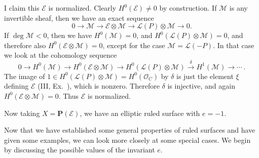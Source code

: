 {I claim this $\mathcal E$ is normalized. Clearly $H^0(\mathcal E)\ne0$ by construction. If $\mathcal M$ is any invertible sheaf, then we have an exact sequence
\[
0\to\mathcal M\to\mathcal E\otimes\mathcal M\to\mathcal L(P)\otimes\mathcal M\to0.
\]
If $\deg\mathcal M<0$, then we have $H^0(\mathcal M)=0$, and $H^0(\mathcal L(P)\otimes\mathcal M)=0$, and therefore also $H^0(\mathcal E\otimes\mathcal M)=0$, except for the case $\mathcal M=\mathcal L(-P)$. In that case we look at the cohomology sequence
\[
0\to H^0(\mathcal M)\to H^0(\mathcal E\otimes\mathcal M)\to H^0(\mathcal L(P)\otimes\mathcal M)\xrightarrow{\delta}H^1(\mathcal M)\to\cdots\,.
\]
The image of $1\in H^0(\mathcal L(P)\otimes\mathcal M)=H^0(\mathcal O_C)$ by $\delta$ is just the element $\xi$ defining $\mathcal E$ (III, Ex.~), which is nonzero. Therefore $\delta$ is injective, and again $H^0(\mathcal E\otimes\mathcal M)=0$. Thus $\mathcal E$ is normalized.

Now taking $X=\mathbf P(\mathcal E)$, we have an elliptic ruled surface with $e=-1$.

\medskip
Now that we have established some general properties of ruled surfaces and have given some examples, we can look more closely at some special cases. We begin by discussing the possible values of the invariant $e$.
}
